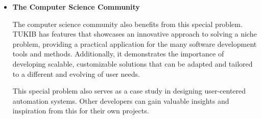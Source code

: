 \begin{itemize}
\item \textbf{The Computer Science Community}

\subitem The computer science community also benefits from this special problem. TUKIB has features that showcases an innovative approach to solving a niche problem, providing a practical application for the many software development tools and methods. Additionally, it demonstrates the importance of developing scalable, customizable solutions that can be adapted and tailored to a different and evolving of user needs.

\subitem This special problem also serves as a case study in designing user-centered automation systems. Other developers can gain valuable insights and inspiration from this for their own projects.

\end {itemize}

